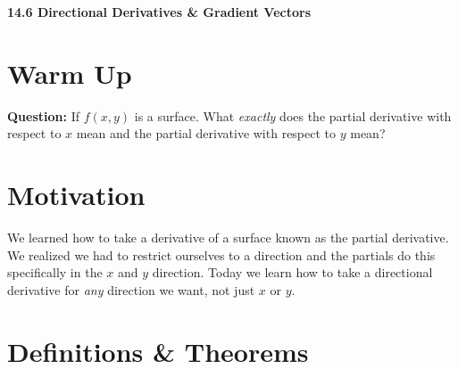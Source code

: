 \documentclass[11pt]{article}
\newcommand{\vs}{\vspace*{.1in}}
\begin{document}
\begin{LARGE}\begin{center}\bf 14.6 Directional Derivatives \& Gradient Vectors\end{center}
\end{LARGE}

\vs\vs



\section{Warm Up}
\textbf{Question:} If $f(x,y)$ is a surface. What \emph{exactly} does the partial derivative with respect to $x$ mean and the partial derivative with respect to $y$ mean?


\section{Motivation}
We learned how to take a derivative of a surface known as the partial derivative. We realized we had to restrict ourselves to a direction and the partials do this specifically in the $x$ and $y$ direction. Today we learn how to take a directional derivative for \emph{any} direction we want, not just $x$ or $y$.

\section{Definitions \& Theorems}
\end{document}
